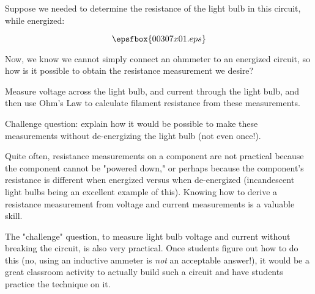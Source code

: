 

Suppose we needed to determine the resistance of the light bulb in this circuit, while energized:

$$\epsfbox{00307x01.eps}$$

Now, we know we cannot simply connect an ohmmeter to an energized circuit, so how is it possible to obtain the resistance measurement we desire?







Measure voltage across the light bulb, and current through the light bulb, and then use Ohm's Law to calculate filament resistance from these measurements.

\vskip 10pt

Challenge question: explain how it would be possible to make these measurements without de-energizing the light bulb (not even once!).







Quite often, resistance measurements on a component are not practical because the component cannot be "powered down," or perhaps because the component's resistance is different when energized versus when de-energized (incandescent light bulbs being an excellent example of this).  Knowing how to derive a resistance measurement from voltage and current measurements is a valuable skill.

The "challenge" question, to measure light bulb voltage and current without breaking the circuit, is also very practical.  Once students figure out how to do this (no, using an inductive ammeter is {\it not} an acceptable answer!), it would be a great classroom activity to actually build such a circuit and have students practice the technique on it.




